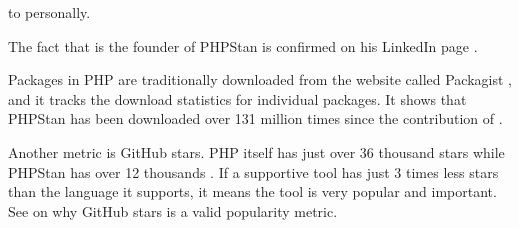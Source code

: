 
to \mrl personally.

The fact that \MrMirtes is the founder of PHPStan
is confirmed on his LinkedIn page .



Packages in PHP are traditionally downloaded from the website called Packagist ,
and it tracks the download statistics for individual packages.
It shows that PHPStan has been downloaded over 131 million times
since the contribution of \mrl {}.

Another metric is GitHub stars.
PHP itself has just over 36 thousand stars while PHPStan has over 12 thousands .
If a supportive tool has just 3 times less stars than the language it supports,
it means the tool is very popular and important.
See  on why GitHub stars is a valid popularity metric.
